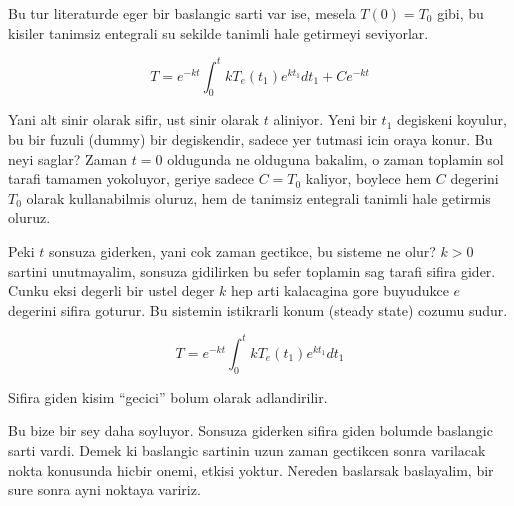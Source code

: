 \documentclass[12pt,fleqn]{article}\usepackage{../common}
\begin{document}
Bu tur literaturde eger bir baslangic sarti var ise, mesela $T(0) =
T_0$ gibi, 
bu kisiler tanimsiz entegrali su sekilde tanimli hale getirmeyi seviyorlar. 

\[ T = e^{-kt} \int_0^t kT_e(t_1) e^{kt_1} dt_1 + C e^{-kt} \]

Yani alt sinir olarak sifir, ust sinir olarak $t$ aliniyor. Yeni bir
$t_1$ degiskeni koyulur, bu bir fuzuli (dummy) bir degiskendir, sadece
yer tutmasi icin oraya konur. Bu neyi saglar? Zaman $t=0$ oldugunda ne
olduguna bakalim, o zaman toplamin sol tarafi tamamen yokoluyor,
geriye sadece $C = T_0$ kaliyor, boylece hem $C$ degerini $T_0$ olarak
kullanabilmis oluruz, hem de tanimsiz entegrali tanimli hale getirmis
oluruz. 

Peki $t$ sonsuza giderken, yani cok zaman gectikce, bu sisteme ne
olur? $k > 0$ sartini unutmayalim, sonsuza gidilirken bu sefer
toplamin sag tarafi sifira gider. Cunku eksi degerli bir ustel deger
$k$ hep arti kalacagina gore buyudukce $e$ degerini sifira
goturur. Bu sistemin istikrarli konum (steady state) cozumu sudur.

\[ T = e^{-kt} \int_0^t kT_e(t_1) e^{kt_1} dt_1 \]

Sifira giden kisim ``gecici'' bolum olarak adlandirilir. 

Bu bize bir sey daha soyluyor. Sonsuza giderken sifira giden bolumde
baslangic sarti vardi. Demek ki baslangic sartinin uzun zaman
gectikcen sonra varilacak nokta konusunda hicbir onemi, etkisi
yoktur. Nereden baslarsak baslayalim, bir sure sonra ayni noktaya
variriz. 
\end{document}
